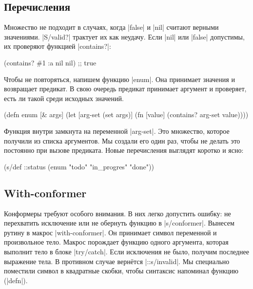 \subsection{Перечисления}


Множество не подходит в случаях, когда \spverb|false| и \spverb|nil| считают
верными значениями. \spverb|S/valid?| трактует их как неудачу. Если \spverb|nil|
или \spverb|false| допустимы, их проверяют функцией \spverb|contains?|:

\begin{english}
  \begin{clojure}
(contains? #{1 :a nil} nil) ;; true
  \end{clojure}
\end{english}

Чтобы не повторяться, напишем функцию \spverb|enum|. Она принимает значения и
возвращает предикат. В свою очередь предикат принимает аргумент и проверяет,
есть ли такой среди исходных значений.

\begin{english}
  \begin{clojure}
(defn enum [& args]
  (let [arg-set (set args)]
    (fn [value]
      (contains? arg-set value))))
  \end{clojure}
\end{english}

Функция внутри замкнута на переменной \spverb|arg-set|. Это множество, которое
получили из списка аргументов. Мы создали его один раз, чтобы не делать это
постоянно при вызове предиката. Новые перечисления выглядят коротко и ясно:

\begin{english}
  \begin{clojure}
(s/def ::status
  (enum "todo" "in_progres" "done"))
  \end{clojure}
\end{english}

\subsection{With-conformer}


Конформеры требуют особого внимания. В них легко допустить ошибку: не
перехватить исключение или не обернуть функцию в \spverb|s/conformer|. Вынесем
рутину в макрос \spverb|with-conformer|. Он принимает символ переменной и
произвольное тело. Макрос порождает функцию одного аргумента, которая выполнит
тело в блоке \spverb|try/catch|. Если исключения не было, получим последнее
выражение тела. В противном случае верн\"{е}тся \spverb|::s/invalid|. Мы
специально поместили символ в квадратные скобки, чтобы синтаксис напоминал
функцию (\spverb|defn|).


